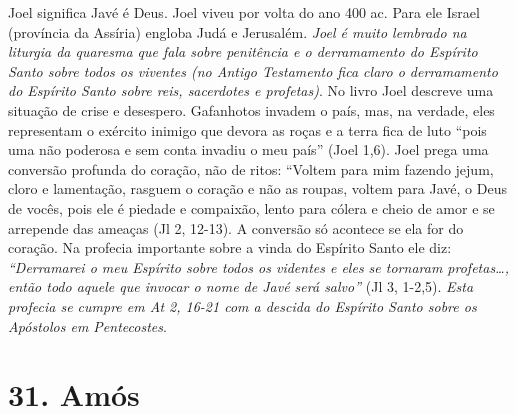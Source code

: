 \documentclass[
]{book}
\begin{document}
Joel significa Javé é Deus. Joel viveu por volta do ano 400 ac. Para ele Israel (província da Assíria) engloba Judá e Jerusalém. \emph{Joel é muito lembrado na liturgia da quaresma que fala sobre penitência e o derramamento do Espírito Santo sobre todos os viventes (no Antigo Testamento fica claro o derramamento do Espírito Santo sobre reis, sacerdotes e profetas)}. No livro Joel descreve uma situação de crise e desespero. Gafanhotos invadem o país, mas, na verdade, eles representam o exército inimigo que devora as roças e a terra fica de luto ``pois uma não poderosa e sem conta invadiu o meu país'' (Joel 1,6). Joel prega uma conversão profunda do coração, não de ritos: ``Voltem para mim fazendo jejum, cloro e lamentação, rasguem o coração e não as roupas, voltem para Javé, o Deus de vocês, pois ele é piedade e compaixão, lento para cólera e cheio de amor e se arrepende das ameaças (Jl 2, 12-13). A conversão só acontece se ela for do coração. Na profecia importante sobre a vinda do Espírito Santo ele diz: \emph{``Derramarei o meu Espírito sobre todos os videntes e eles se tornaram profetas\ldots, então todo aquele que invocar o nome de Javé será salvo''} (Jl 3, 1-2,5). \emph{Esta profecia se cumpre em At 2, 16-21 com a descida do Espírito Santo sobre os Apóstolos em Pentecostes}.

\hypertarget{amuxf3s}{%
\section*{31. Amós}\label{amuxf3s}}
\end{document}
